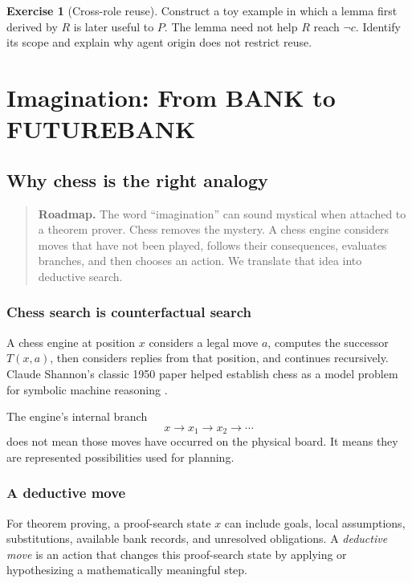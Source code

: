 \documentclass[11pt,openany]{book}
\theoremstyle{definition}
\newtheorem{exercise}[theorem]{Exercise}
\theoremstyle{remark}
\newenvironment{roadmap}{\begin{quote}\small\color{deepblue}\textbf{Roadmap.} }{\end{quote}}
\begin{document}
\begin{exercise}[Cross-role reuse]\label{ex:cross}
Construct a toy example in which a lemma first derived by $R$ is later useful to $P$. The lemma need not help $R$ reach $\neg c$. Identify its scope and explain why agent origin does not restrict reuse.
\end{exercise}

\part{Imagination: From BANK to FUTUREBANK}

\chapter{Why chess is the right analogy}
\begin{roadmap}
The word ``imagination'' can sound mystical when attached to a theorem prover. Chess removes the mystery. A chess engine considers moves that have not been played, follows their consequences, evaluates branches, and then chooses an action. We translate that idea into deductive search.
\end{roadmap}

\section{Chess search is counterfactual search}
A chess engine at position $x$ considers a legal move $a$, computes the successor $T(x,a)$, then considers replies from that position, and continues recursively. Claude Shannon's classic 1950 paper helped establish chess as a model problem for symbolic machine reasoning \cite{Shannon1950}.

The engine's internal branch
\[
x\to x_1\to x_2\to\cdots
\]
does not mean those moves have occurred on the physical board. It means they are represented possibilities used for planning.

\section{A deductive move}
For theorem proving, a proof-search state $x$ can include goals, local assumptions, substitutions, available bank records, and unresolved obligations. A \emph{deductive move} is an action that changes this proof-search state by applying or hypothesizing a mathematically meaningful step.
\end{document}
